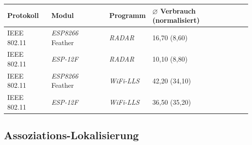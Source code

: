 \documentclass[18pt]{beamer}
\begin{document}
\begin{frame}
	\begin{tabular}{l|l|l|R{2.5cm}}
		Protokoll & Modul & Programm  & $\varnothing$ Verbrauch (normalisiert)\\
		\hline
		IEEE 802.11 & \emph{ESP8266} Feather & \emph{RADAR} & 16,70 (8,60)\\
		IEEE 802.11 & \emph{ESP-12F} & \emph{RADAR} & 10,10 (8,80) \\
		\hline
		IEEE 802.11 & \emph{ESP8266} Feather & \emph{WiFi-LLS} & 42,20 (34,10)\\
		IEEE 802.11 & \emph{ESP-12F} & \emph{WiFi-LLS} & 36,50 (35,20)\\
	\end{tabular}
\end{frame}

\subsection{Assoziations-Lokalisierung}
\end{document}
